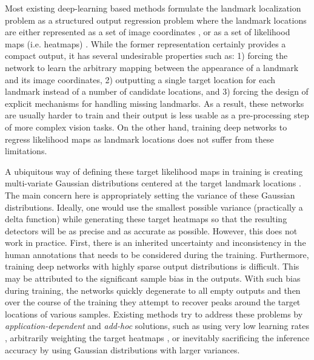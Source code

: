 \documentclass[10pt,twocolumn,letterpaper]{article}
\begin{document}
Most existing deep-learning based methods formulate the landmark localization problem as a structured output regression problem where the landmark locations are either represented as a set of image coordinates \cite{zhangpami,wu2017}, or as a set of likelihood maps (i.e. heatmaps) \cite{thompson,hg,honari2018,san,dong2018}. While the former representation certainly provides a compact output, it has several undesirable properties such as: 1) forcing the network to learn the arbitrary mapping between the appearance of a landmark and its image coordinates,  2) outputting a single target location for each landmark instead of a number of candidate locations, and 3) forcing the design of explicit mechanisms for handling missing landmarks. As a result, these networks are usually harder to train and their output is less usable as a pre-processing step of more complex vision tasks. On the other hand, training deep networks to regress likelihood maps as landmark locations does not suffer from these limitations.



A ubiquitous way of defining these target likelihood maps in training is creating multi-variate Gaussian distributions centered at the target landmark locations \cite{thompson, hg, honari2018, san,dong2018, wei,yang, chu,ke}. The main concern here is appropriately setting the variance of these Gaussian distributions. Ideally, one would use the smallest possible variance (practically a delta function) while generating these target heatmaps so that the resulting detectors will be as precise and as accurate as possible. However, this does not work in practice. First, there is an inherited uncertainty and inconsistency in the human annotations \cite{lampert2016} that needs to be considered during the training. Furthermore, training deep networks with highly sparse output distributions is difficult. This may be attributed to the significant sample bias in the outputs. With such bias during training, the networks quickly degenerate to all empty outputs and then over the course of the training they attempt to recover peaks around the target locations of various samples. Existing methods try to address these problems by \textit{application-dependent} and \textit{add-hoc} solutions, such as using very low learning rates \cite{hg,unite}, arbitrarily weighting the target heatmaps \cite{davison2018,neil2018}, or inevitably sacrificing the inference accuracy by using Gaussian distributions with larger variances. 
\end{document}
